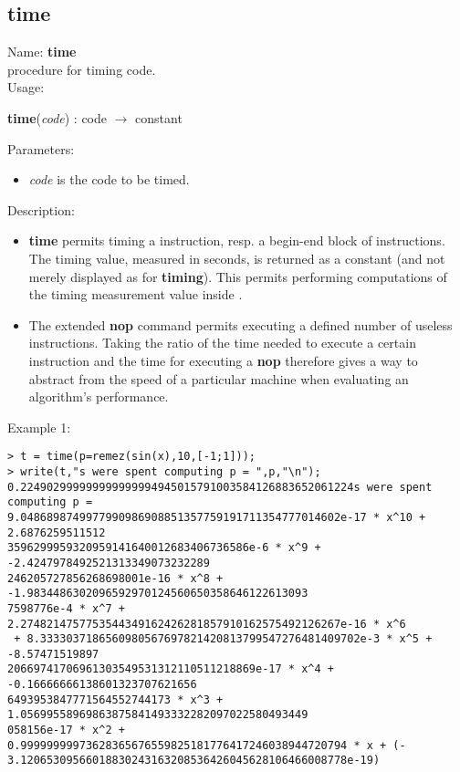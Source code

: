 \subsection{time}
\label{labtime}
\noindent Name: \textbf{time}\\
\phantom{aaa}procedure for timing \sollya code.\\[0.2cm]
\noindent Usage: 
\begin{center}
\textbf{time}(\emph{code}) : \textsf{code} $\rightarrow$ \textsf{constant}\\
\end{center}
Parameters: 
\begin{itemize}
\item \emph{code} is the code to be timed.
\end{itemize}
\noindent Description: \begin{itemize}

\item \textbf{time} permits timing a \sollya instruction, resp. a begin-end block
   of \sollya instructions. The timing value, measured in seconds, is returned
   as a \sollya constant (and not merely displayed as for \textbf{timing}). This 
   permits performing computations of the timing measurement value inside \sollya.

\item The extended \textbf{nop} command permits executing a defined number of
   useless instructions. Taking the ratio of the time needed to execute a
   certain \sollya instruction and the time for executing a \textbf{nop}
   therefore gives a way to abstract from the speed of a particular 
   machine when evaluating an algorithm's performance.
\end{itemize}
\noindent Example 1: 
\begin{center}\begin{minipage}{15cm}\begin{Verbatim}[frame=single]
> t = time(p=remez(sin(x),10,[-1;1]));
> write(t,"s were spent computing p = ",p,"\n");
0.224902999999999999994945015791003584126883652061224s were spent computing p = 
9.0486898749977990986908851357759191711354777014602e-17 * x^10 + 2.6876259511512
3596299959320959141640012683406736586e-6 * x^9 + -2.4247978492521313349073232289
246205727856268698001e-16 * x^8 + -1.9834486302096592970124560650358646122613093
7598776e-4 * x^7 + 2.2748214757753544349162426281857910162575492126267e-16 * x^6
 + 8.3333037186560980567697821420813799547276481409702e-3 * x^5 + -8.57471519897
20669741706961303549531312110511218869e-17 * x^4 + -0.16666666138601323707621656
6493953847771564552744173 * x^3 + 1.05699558969863875841493332282097022580493449
058156e-17 * x^2 + 0.99999999973628365676559825181776417246038944720794 * x + (-
3.12065309566018830243163208536426045628106466008778e-19)
\end{Verbatim}
\end{minipage}\end{center}
